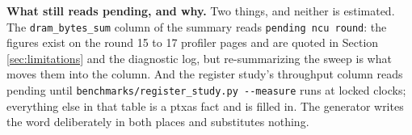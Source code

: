 \textbf{What still reads pending, and why.} Two things, and neither is estimated.
The \texttt{dram\_bytes\_sum} column of the summary reads \texttt{pending ncu
round}: the figures exist on the round 15 to 17 profiler pages and are quoted in
Section \ref{sec:limitations} and the diagnostic log, but re-summarizing the sweep
is what moves them into the column. And the register study's throughput column
reads pending until \texttt{benchmarks/register\_study.py -{}-measure} runs at locked
clocks; everything else in that table is a ptxas fact and is filled in. The
generator writes the word deliberately in both places and substitutes nothing.
